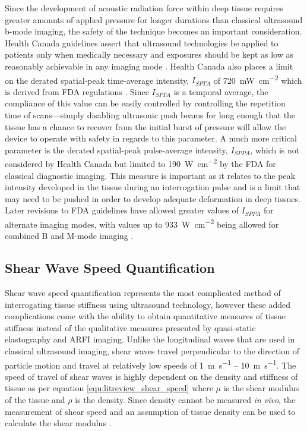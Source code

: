 			Since the development of acoustic radiation force within deep tissue requires greater amounts of applied pressure for longer durations than classical ultrasound b-mode imaging, the safety of the technique becomes an important consideration. Health Canada guidelines assert that ultrasound technologies be applied to patients only when medically necessary and exposures should be kept as low as reasonably achievable in any imaging mode \cite{HealthCanadaUltrasound}. Health Canada also places a limit on the derated spatial-peak time-average intensity, $I_{SPTA}$ of \SI{720}{\mW\per\cm\squared} which is derived from FDA regulations \cite{FDAUltrasoundGuidelines}. Since $I_{SPTA}$ is a temporal average, the compliance of this value can be easily controlled by controlling the repetition time of scans---simply disabling ultrasonic push beams for long enough that the tissue has a chance to recover from the initial burst of pressure will allow the device to operate with safety in regards to this parameter. A much more critical parameter is the derated spatial-peak pulse-average intensity, $I_{SPPA}$, which is not considered by Health Canada but limited to \SI{190}{\W\per\cm\squared} by the FDA \cite{FDAUltrasoundGuidelines} for classical diagnostic imaging. This measure is important as it relates to the peak intensity developed in the tissue during an interrogation pulse and is a limit that may need to be pushed in order to develop adequate deformation in deep tissues. Later revisions to FDA guidelines have allowed greater values of $I_{SPPA}$ for alternate imaging modes, with values up to \SI{933}{\W\per\cm\squared} being allowed for combined B and M-mode imaging \cite{hoskins10}.

		\subsection{Shear Wave Speed Quantification}
			Shear wave speed quantification represents the most complicated method of interrogating tissue stiffness using ultrasound technology, however these added complications come with the ability to obtain quantitative measures of tissue stiffness instead of the qualitative measures presented by quasi-static elastography and ARFI imaging. Unlike the longitudinal waves that are used in classical ultrasound imaging, shear waves travel perpendicular to the direction of particle motion and travel at relatively low speeds of \SI{1}{\m\per\s} -- \SI{10}{\m\per\s}. The speed of travel of shear waves is highly dependent on the density and stiffness of tissue as per equation \ref{equ:litreview_shear_speed} where $\mu$ is the shear modulus of the tissue and $\rho$ is the density. Since density cannot be measured \emph{in vivo}, the measurement of shear speed and an assumption of tissue density can be used to calculate the shear modulus \cite{hoskins10}.

